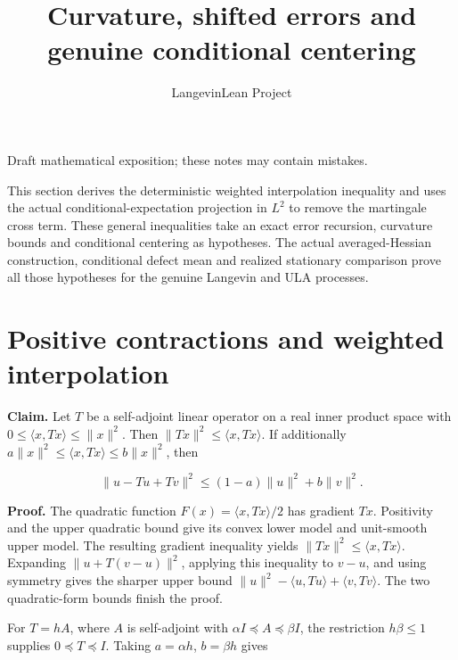 \documentclass[11pt,a4paper]{article}
\title{\texorpdfstring{Curvature, shifted errors and genuine conditional centering}{Curvature, shifted errors and genuine conditional centering}}
\author{LangevinLean Project}
\date{}
\begin{document}
\maketitle
Draft mathematical exposition; these notes may contain mistakes.


This section derives the deterministic weighted interpolation inequality and uses the actual conditional-expectation projection in \(L^2\) to remove the martingale cross term. These general inequalities take an exact error recursion, curvature bounds and conditional centering as hypotheses. The actual averaged-Hessian construction, conditional defect mean and realized stationary comparison prove all those hypotheses for the genuine Langevin and ULA processes.


\section{\texorpdfstring{Positive contractions and weighted interpolation}{Positive contractions and weighted interpolation}}


\textbf{Claim.} Let \(T\) be a self-adjoint linear operator on a real inner product space with \(0\le\langle x,Tx\rangle\le\|x\|^2\). Then \(\|Tx\|^2\le\langle x,Tx\rangle\). If additionally \(a\|x\|^2\le\langle x,Tx\rangle\le b\|x\|^2\), then

\[\|u-Tu+Tv\|^2\le(1-a)\|u\|^2+b\|v\|^2.\]


\textbf{Proof.} The quadratic function \(F(x)=\langle x,Tx\rangle/2\) has gradient \(Tx\). Positivity and the upper quadratic bound give its convex lower model and unit-smooth upper model. The resulting gradient inequality yields \(\|Tx\|^2\le\langle x,Tx\rangle\). Expanding \(\|u+T(v-u)\|^2\), applying this inequality to \(v-u\), and using symmetry gives the sharper upper bound \(\|u\|^2-\langle u,Tu\rangle+\langle v,Tv\rangle\). The two quadratic-form bounds finish the proof.




For \(T=hA\), where \(A\) is self-adjoint with \(\alpha I\preceq A\preceq\beta I\), the restriction \(h\beta\le1\) supplies \(0\preceq T\preceq I\). Taking \(a=\alpha h\), \(b=\beta h\) gives
\end{document}
